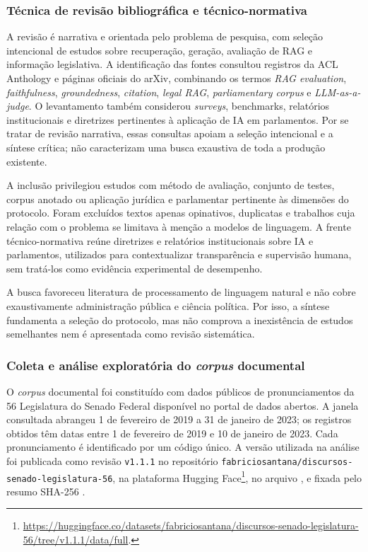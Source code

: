 \subsubsection{Técnica de revisão bibliográfica e técnico-normativa}

A revisão é narrativa e orientada pelo problema de pesquisa, com seleção intencional de estudos sobre recuperação, geração, avaliação de RAG e informação legislativa. A identificação das fontes consultou registros da ACL Anthology e páginas oficiais do arXiv, combinando os termos \textit{RAG evaluation}, \textit{faithfulness}, \textit{groundedness}, \textit{citation}, \textit{legal RAG}, \textit{parliamentary corpus} e \textit{LLM-as-a-judge}. O levantamento também considerou \textit{surveys}, benchmarks, relatórios institucionais e diretrizes pertinentes à aplicação de IA em parlamentos. Por se tratar de revisão narrativa, essas consultas apoiam a seleção intencional e a síntese crítica; não caracterizam uma busca exaustiva de toda a produção existente.

A inclusão privilegiou estudos com método de avaliação, conjunto de testes, corpus anotado ou aplicação jurídica e parlamentar pertinente às dimensões do protocolo. Foram excluídos textos apenas opinativos, duplicatas e trabalhos cuja relação com o problema se limitava à menção a modelos de linguagem. A frente técnico-normativa reúne diretrizes e relatórios institucionais sobre IA e parlamentos, utilizados para contextualizar transparência e supervisão humana, sem tratá-los como evidência experimental de desempenho.

A busca favoreceu literatura de processamento de linguagem natural e não cobre exaustivamente administração pública e ciência política. Por isso, a síntese fundamenta a seleção do protocolo, mas não comprova a inexistência de estudos semelhantes nem é apresentada como revisão sistemática.

\subsubsection{Coleta e análise exploratória do \textit{corpus} documental}\label{sec:coleta-corpus}

O \textit{corpus} documental foi constituído com dados públicos de pronunciamentos da 56\textordfeminine{} Legislatura do Senado Federal disponível no portal de dados abertos. A janela consultada abrangeu 1 de fevereiro de 2019 a 31 de janeiro de 2023; os registros obtidos têm datas entre 1 de fevereiro de 2019 e 10 de janeiro de 2023. Cada pronunciamento é identificado por um código único. A versão utilizada na análise foi publicada como revisão \texttt{v1.1.1} no repositório \texttt{fabriciosantana/discursos-senado-legislatura-56}, na plataforma Hugging Face\footnote{\url{https://huggingface.co/datasets/fabriciosantana/discursos-senado-legislatura-56/tree/v1.1.1/data/full}.}, no arquivo , e fixada pelo resumo SHA-256 .

